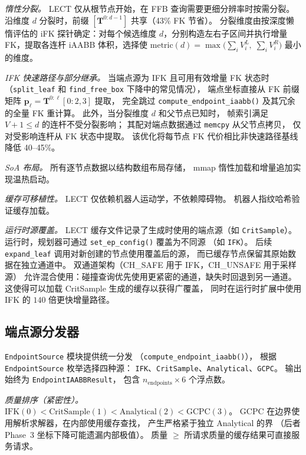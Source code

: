 \documentclass[journal]{IEEEtran}
\newcommand{\bT}{\mathbf{T}}
\begin{document}
\emph{惰性分裂。}
LECT 仅从根节点开始，在 FFB 查询需要更细分辨率时按需分裂。
沿维度 $d$ 分裂时，前缀 $[\bT^{0:d-1}]$ 共享（43\% FK 节省）。
分裂维度由按深度懒惰评估的 iFK 探针确定：对每个候选维度
$d$，分别构造左右子区间并执行增量 FK，提取各连杆 iAABB 体积，选择使
$\text{metric}(d) = \max\bigl(\sum_i V_i^L,\; \sum_i V_i^R\bigr)$ 最小的维度。

\emph{IFK 快速路径与部分继承。}
当端点源为 IFK 且可用有效增量 FK 状态时
（\texttt{split\_leaf} 和 \texttt{find\_free\_box} 下降中的常见情况），
端点坐标直接从 FK 前缀矩阵
$\bm{p}_\ell = \bT^{0:\ell}[0{:}2,3]$ 提取，
完全跳过 \texttt{compute\_endpoint\_iaabb()} 及其冗余的全量 FK 重计算。
此外，当分裂维度 $d$ 和父节点已知时，
帧索引满足 $V+1 \leq d$ 的连杆不受分裂影响；
其配对端点数据通过 \texttt{memcpy} 从父节点拷贝，
仅对受影响连杆从 FK 状态中提取。
该优化将每节点 FK 代价相比非快速路径基线降低 40--45\%。

\emph{SoA 布局。}
所有逐节点数据以结构数组布局存储，
mmap 惰性加载和增量追加实现温热启动。

\emph{缓存可移植性。}
LECT 仅依赖机器人运动学，不依赖障碍物。
机器人指纹哈希验证缓存加载。

\emph{运行时源覆盖。}
LECT 缓存文件记录了生成时使用的端点源（如 \texttt{CritSample}）。
运行时，规划器可通过 \texttt{set\_ep\_config()} 覆盖为不同源
（如 \texttt{IFK}）。
后续 \texttt{expand\_leaf} 调用对新创建的节点使用覆盖后的源，
而已缓存节点保留其原始数据在独立通道中。
双通道架构（CH\_SAFE 用于 IFK，CH\_UNSAFE 用于采样源）
允许混合使用：碰撞查询优先使用更紧密的通道，缺失时回退到另一通道。
这使得可以加载 CritSample 生成的缓存以获得广覆盖，
同时在运行时扩展中使用 IFK 的 $140$ 倍更快增量路径。

\subsection{端点源分发器}\label{sec:endpoint_dispatch}

\texttt{EndpointSource} 模块提供统一分发
（\texttt{compute\_endpoint\_iaabb()}），
根据 \texttt{EndpointSource} 枚举选择四种源：
\texttt{IFK}、\texttt{CritSample}、\texttt{Analytical}、\texttt{GCPC}。
输出始终为 \texttt{EndpointIAABBResult}，
包含 $n_\text{endpoints} \times 6$ 个浮点数。

\emph{质量排序（紧密性）。}
$\mathrm{IFK}(0) < \mathrm{CritSample}(1) <
\mathrm{Analytical}(2) < \mathrm{GCPC}(3)$。
GCPC 在边界使用解析求解器，在内部使用缓存查找，
产生严格紧于独立 Analytical 的界
（后者 Phase~3 坐标下降可能遗漏内部极值）。
质量 $\geq$ 所请求质量的缓存结果可直接服务请求。
\end{document}
